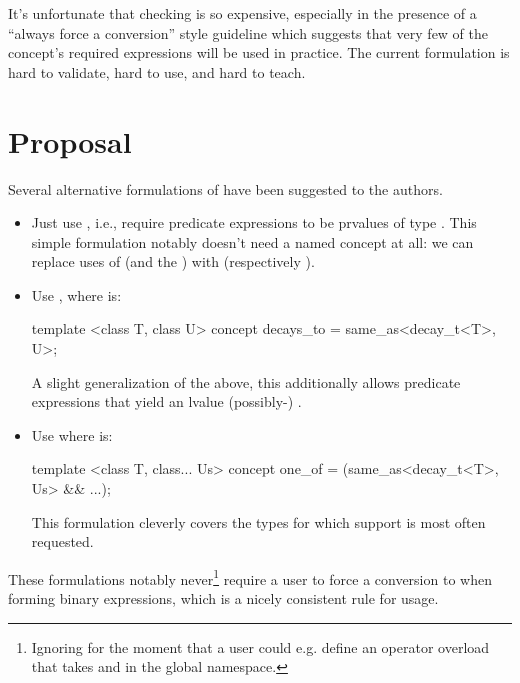 It's unfortunate that checking  is so expensive, especially in the presence of
a ``always force a conversion'' style guideline which suggests that very few of the concept's required
expressions will be used in practice. The current formulation is hard to validate, hard to use, and
hard to teach.

\chapter{Proposal}

Several alternative formulations of  have been suggested to the authors.

\begin{itemize}
\item Just use , i.e., require predicate expressions to be prvalues of type .
  This simple formulation notably doesn't need a named concept at all: we can replace uses of
   (and the 
  ) with  (respectively
  ).
\item Use , where  is:
  \begin{codeblock}
  template <class T, class U>
  concept decays_to = same_as<decay_t<T>, U>;
  \end{codeblock}
  A slight generalization of the above, this additionally allows predicate expressions that yield an
  lvalue (possibly-) .
\item Use  where  is:
  \begin{codeblock}
  template <class T, class... Us>
  concept one_of = (same_as<decay_t<T>, Us> && ...);
  \end{codeblock}
  This formulation cleverly covers the types for which  support is most often
  requested.
\end{itemize}
These formulations notably never\footnote{Ignoring for the moment that a user could e.g. define
an operator overload that takes  and  in the global namespace.} require
a user to force a conversion to  when forming binary expressions, which is a nicely
consistent rule for usage.

